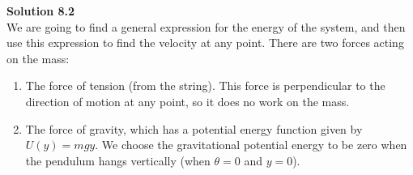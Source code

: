 \begin{framed}
\textbf{Solution 8.2}\\
We are going to find a general expression for the energy of the system, and then use this expression to find the velocity at any point. There are two forces acting on the mass:

\begin{enumerate}
\item The force of tension (from the string). This force is perpendicular to the direction of motion at any point, so it does no work on the mass.
\item The force of gravity, which has a potential energy function given by $U(y)=mgy$. We choose the gravitational potential energy to be zero when the pendulum hangs vertically (when $\theta=0$ and $y=0$).
\end{enumerate}


\end{framed}
